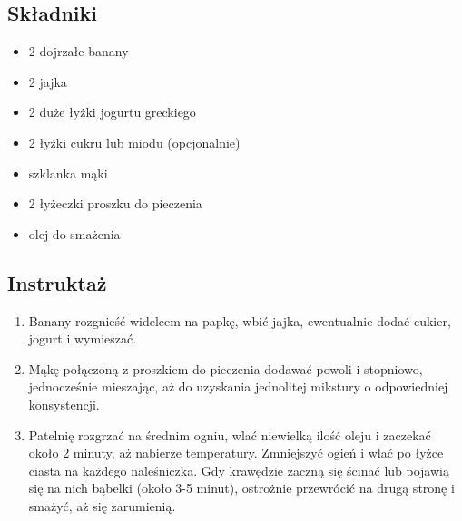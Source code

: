 \documentclass[a4paper,10pt]{book}
\begin{document}
\begin{multicols}{2}

\subsection*{Składniki} \begin{itemize} \item 2 dojrzałe banany \item 2 jajka \item 2 duże łyżki jogurtu greckiego \item 2 łyżki cukru lub miodu (opcjonalnie) \item szklanka mąki \item 2 łyżeczki proszku do pieczenia \item olej do smażenia \end{itemize}

\columnbreak

\begin{figure}[H] \centering 
{}
\end{figure}

\end{multicols}

\vspace{0.5cm}

\subsection*{Instruktaż} \begin{enumerate} \item Banany rozgnieść widelcem na papkę, wbić jajka, ewentualnie dodać cukier, jogurt i wymieszać. \item Mąkę połączoną z proszkiem do pieczenia dodawać powoli i stopniowo, jednocześnie mieszając, aż do uzyskania jednolitej mikstury o odpowiedniej konsystencji. \item Patelnię rozgrzać na średnim ogniu, wlać niewielką ilość oleju i zaczekać około 2 minuty, aż nabierze temperatury. Zmniejszyć ogień i wlać po łyżce ciasta na każdego naleśniczka. Gdy krawędzie zaczną się ścinać lub pojawią się na nich bąbelki (około 3-5 minut), ostrożnie przewrócić na drugą stronę i smażyć, aż się zarumienią. \end{enumerate}
\end{document}
